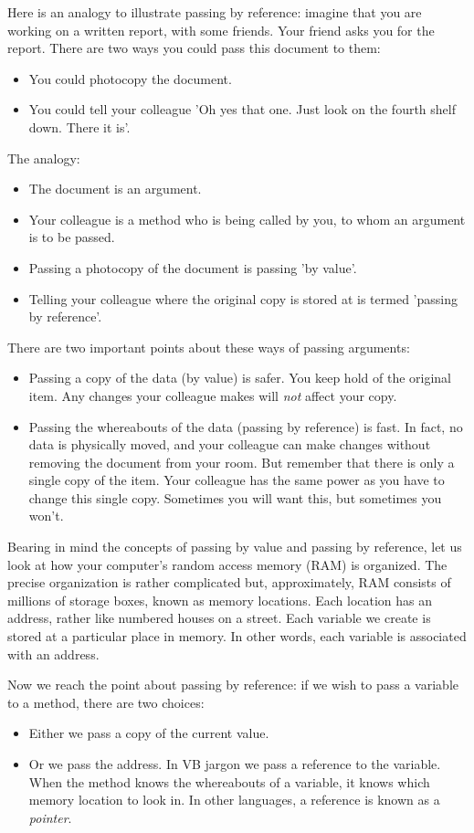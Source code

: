 		Here is an analogy to illustrate passing by reference: imagine that you are working on a written report, with some friends. Your friend asks you for the report. There are two ways you could pass this document to them:
		\begin{itemize}
			\item You could photocopy the document.
			\item You could tell your colleague 'Oh yes that one. Just look on the fourth shelf down. There it is'.
		\end{itemize}
		The analogy:
		\begin{itemize}
			\item The document is an argument.
			\item Your colleague is a method who is being called by you, to whom an argument is to be passed.
			\item Passing a photocopy of the document is passing 'by value'.
			\item Telling your colleague where the original copy is stored at is termed 'passing by reference'.
		\end{itemize}
		There are two important points about these ways of passing arguments:
		\begin{itemize}
			\item Passing a copy of the data (by value) is safer. You keep hold of the original item. Any changes your colleague makes will \emph{not} affect your copy.
			\item Passing the whereabouts of the data (passing by reference) is fast. In fact, no data is physically moved, and your colleague can make changes without removing the document from your room. But remember that there is only a single copy of the item. Your colleague has the same power as you have to change this single copy. Sometimes you will want this, but sometimes you won't.
		\end{itemize}
		Bearing in mind the concepts of passing by value and passing by reference, let us look at how your computer's random access memory (RAM) is organized. The precise organization is rather complicated but, approximately, RAM consists of millions of storage boxes, known as memory locations. Each location has an address, rather like numbered houses on a street. Each variable we create is stored at a particular place in memory. In other words, each variable is associated with an address.
		
		Now we reach the point about passing by reference: if we wish to pass a variable to a method, there are two choices:
		\begin{itemize}
			\item Either we pass a copy of the current value.
			\item Or we pass the address. In VB jargon we pass a reference to the variable. When the method knows the whereabouts of a variable, it knows which memory location to look in. In other languages, a reference is known as a \emph{pointer}.
		\end{itemize}

